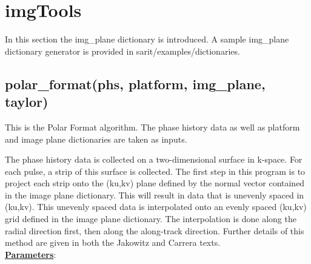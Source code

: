 \documentclass{article}
\begin{document}
\newpage

\section{imgTools}
In this section the img\_plane dictionary is introduced.  A sample img\_plane dictionary generator is provided in sarit/examples/dictionaries.

\subsection{polar\_format(phs, platform, img\_plane, taylor)}
This is the Polar Format algorithm.  The phase history data as well as platform and image plane dictionaries are taken as inputs. 

The phase history data is collected on a two-dimensional surface in k-space.  For each pulse, a strip of this surface is collected.  The first step in this program is to project each strip onto the (ku,kv) plane defined by the normal vector contained in the image plane dictionary.  This will result in data that is unevenly spaced in (ku,kv). This unevenly spaced data is interpolated onto an evenly spaced (ku,kv) grid defined in the image plane dictionary.  The interpolation is done along the radial direction first, then along the along-track direction.  Further details of this method are given in both the Jakowitz and Carrera texts.\\

\noindent \underline{\textbf{Parameters}}:
\end{document}
